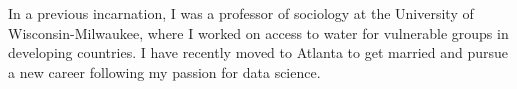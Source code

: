 \begin{cventries}
  \cventry
    {}
    {}
    {}
    {}
    {In a previous incarnation, I was a professor of sociology at the University of Wisconsin-Milwaukee, where I worked on access to water for vulnerable groups in developing countries. I have recently moved to Atlanta to get married and pursue a new career following my passion for data science.}
\end{cventries}
